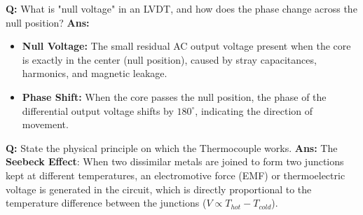 \documentclass[10pt,a4paper,twocolumn]{article}
\begin{document}
\begin{tcolorbox}[
  colback=white,
  colframe=UnitColorOne,
  colbacktitle=gray!10!white,
  coltitle=black,
  fonttitle=\bfseries\sffamily\small,
  title={Unit I $\bullet$ Card 3: LVDT Null Voltage \& Phase Shift},
  boxrule=1.2pt,
  arc=2mm,
  outer arc=2mm,
  boxsep=1.5mm,
  top=1mm,
  bottom=1mm,
  left=1.5mm,
  right=1.5mm,
  before skip=2.5mm,
  after skip=2.5mm
]
\textbf{Q:} What is "null voltage" in an LVDT, and how does the phase change across the null position?
\tcbline
\textbf{Ans:} \begin{itemize}
  \item   \textbf{Null Voltage:} The small residual AC output voltage present when the core is exactly in the center (null position), caused by stray capacitances, harmonics, and magnetic leakage.
  \item   \textbf{Phase Shift:} When the core passes the null position, the phase of the differential output voltage shifts by $180^\circ$, indicating the direction of movement.
\end{itemize}
\end{tcolorbox}


\begin{tcolorbox}[
  colback=white,
  colframe=UnitColorOne,
  colbacktitle=gray!10!white,
  coltitle=black,
  fonttitle=\bfseries\sffamily\small,
  title={Unit I $\bullet$ Card 4: Thermocouple \& Seebeck Effect},
  boxrule=1.2pt,
  arc=2mm,
  outer arc=2mm,
  boxsep=1.5mm,
  top=1mm,
  bottom=1mm,
  left=1.5mm,
  right=1.5mm,
  before skip=2.5mm,
  after skip=2.5mm
]
\textbf{Q:} State the physical principle on which the Thermocouple works.
\tcbline
\textbf{Ans:} The \textbf{Seebeck Effect}: When two dissimilar metals are joined to form two junctions kept at different temperatures, an electromotive force (EMF) or thermoelectric voltage is generated in the circuit, which is directly proportional to the temperature difference between the junctions ($V \propto T_{hot} - T_{cold}$).
\end{tcolorbox}
\end{document}
